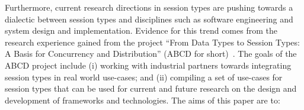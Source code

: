 Furthermore, current research directions in session types are
pushing towards a dialectic between session types and disciplines
such as software engineering and system design and implementation.
Evidence for this trend comes from the research experience
gained from the project
``From Data Types to Session Types: A Basis for Concurrency and Distribution''%
(ABCD for short)~\cite{ABCD}.
The goals of the ABCD project include (i)
working with industrial partners towards integrating
session types in real world use-cases; and (ii)
compiling a set of use-cases
for session types that can be used for current and future research on
the design and development of frameworks and technologies.
%
The aims of this paper are to:
%
